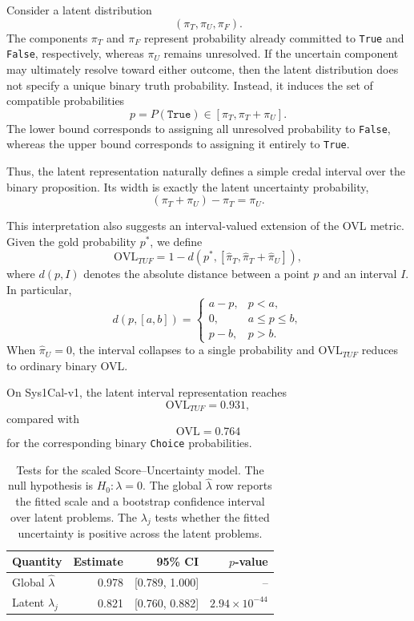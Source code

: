 \documentclass[twoside]{article}
\begin{document}
Consider a latent distribution
\[
(\pi_T,\pi_U,\pi_F).
\]
The components $\pi_T$ and $\pi_F$ represent probability already
committed to \texttt{True} and \texttt{False}, respectively, whereas
$\pi_U$ remains unresolved. If the uncertain component may ultimately
resolve toward either outcome, then the latent distribution does not
specify a unique binary truth probability. Instead, it induces the set
of compatible probabilities
\begin{equation}
p=P(\texttt{True})
\in
[\pi_T,\pi_T+\pi_U].
\label{eq:credal-interval}
\end{equation}
The lower bound corresponds to assigning all unresolved probability to
\texttt{False}, whereas the upper bound corresponds to assigning it
entirely to \texttt{True}.

Thus, the latent representation naturally defines a simple credal
interval over the binary proposition. Its width is exactly the latent
uncertainty probability,
\begin{equation*}
(\pi_T+\pi_U)-\pi_T=\pi_U.
\end{equation*}

This interpretation also suggests an interval-valued extension of the
OVL metric. Given the gold probability $p^*$, we define
\begin{equation*}
\mathrm{OVL}_{TUF}
=
1-
d\!\left(
p^*,
[\widehat{\pi}_T,
 \widehat{\pi}_T+\widehat{\pi}_U]
\right),
\label{eq:interval-ovl}
\end{equation*}
where $d(p,I)$ denotes the absolute distance between a point $p$ and
an interval $I$. In particular,
\[
d(p,[a,b])
=
\begin{cases}
a-p, & p<a,\\
0,   & a\leq p\leq b,\\
p-b, & p>b.
\end{cases}
\]
When $\widehat{\pi}_U=0$, the interval collapses to a single
probability and $\mathrm{OVL}_{TUF}$ reduces to ordinary binary OVL.

On Sys1Cal-v1, the latent interval representation reaches
\[
\mathrm{OVL}_{TUF}=0.931,
\]
compared with
\[
\mathrm{OVL}=0.764
\]
for the corresponding binary \texttt{Choice} probabilities.

\begin{table}[t]
  \caption{Tests for the scaled Score--Uncertainty model.
  The null hypothesis is $H_0:\lambda=0$.
  The global $\hat\lambda$ row reports the fitted scale and a bootstrap
  confidence interval over latent problems. The $\lambda_j$ tests whether the fitted uncertainty is positive across the latent problems.}
  \label{tab:ambiguity-tests}
  \begin{center}
  \begin{tabular}{lrrr}
  \toprule
  Quantity & Estimate & 95\% CI & $p$-value \\
  \midrule
  Global $\hat\lambda$ & 0.978 & [0.789, 1.000] & -- \\
  Latent $\lambda_j$ & 0.821 & [0.760, 0.882] & $2.94{\times}10^{-44}$ \\
  \bottomrule
  \end{tabular}
  \end{center}
\end{table}
\end{document}

